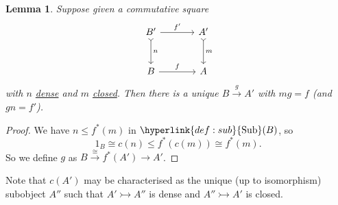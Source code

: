 \documentclass{article}
\DeclareMathOperator{\Sub}{Sub}
\let\to\longrightarrow
\newtheorem{nlemma}[nthm]{Lemma}
\begin{document}
\begin{nlemma}\label{lem:7.17}
  Suppose given a commutative square
  \begin{equation*}
    \begin{tikzcd}[sep=large]
    B' \rar{f'} \dar[tail]{n} & A' \dar[tail]{m}\\
    B \rar{f} & A
  \end{tikzcd}
  \end{equation*}
  with $n$ \hyperlink{def:denseclosed}{dense} and $m$ \hyperlink{def:denseclosed}{closed}.
  Then there is a unique $B \overset{g}\to A'$ with $mg = f$ (and $gn=f'$).
\end{nlemma}
\begin{proof}
  We have $n \leq f^*(m)$ in $\hyperlink{def:sub}{\Sub}(B)$, so
  \begin{equation*}1_B \cong c(n) \leq f^*(c(m)) \cong f^*(m).\end{equation*}
  So we define $g$ as $B \overset{\cong}\to f^*(A') \to A'$.
\end{proof}

Note that $c(A')$ may be characterised as the unique (up to isomorphism) subobject $A''$ such that $A' \rightarrowtail A''$ is dense and $A'' \rightarrowtail A'$ is closed.
\end{document}
